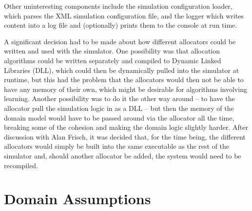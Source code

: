 \documentclass{UoYCSproject}
\begin{document}
Other uninteresting components include the simulation configuration loader, which parses the XML simulation configuration file, and the logger which writes content into a log file and (optionally) prints them to the console at run time.

A significant decision had to be made about how different allocators could be written and used with the simulator.  One possibility was that allocation algorithms could be written separately and compiled to Dynamic Linked Libraries (DLL), which could then be dynamically pulled into the simulator at runtime, but this had the problem that the allocators would then not be able to have any memory of their own, which might be desirable for algorithms involving learning.  Another possibility was to do it the other way around -- to have the allocator pull the simulation logic in as a DLL -- but then the memory of the domain model would have to be passed around via the allocator all the time, breaking some of the cohesion and making the domain logic slightly harder.  After discussion with Alan Frisch, it was decided that, for the time being, the different allocators would simply be built into the same executable as the rest of the simulator and, should another allocator be added, the system would need to be recompiled.

\section{Domain Assumptions}
\end{document}
